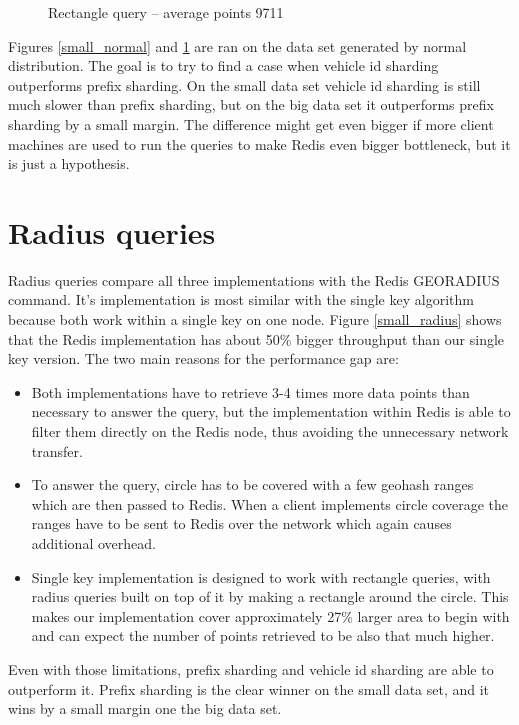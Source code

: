 \documentclass[times, utf8, diplomski]{fer}
\begin{document}
\begin{figure}[h]
\caption{Rectangle query -- average points 9711}
\label{big_normal}
\endminipage\hfill
\end{figure}

Figures \ref{small_normal} and \ref{big_normal} are ran on the data set generated by normal distribution. The goal is to try to find a case when vehicle id sharding outperforms prefix sharding. On the small data set vehicle id sharding is still much slower than prefix sharding, but on the big data set it outperforms prefix sharding by a small margin. The difference might get even bigger if more client machines are used to run the queries to make Redis even bigger bottleneck, but it is just a hypothesis.

\section {Radius queries} \label{radius_results}
Radius queries compare all three implementations with the Redis GEORADIUS command. It's implementation is most similar with the single key algorithm because both work within a single key on one node. Figure \ref{small_radius} shows that the Redis implementation has about 50\% bigger throughput than our single key version. The two main reasons for the performance gap are:
\begin{itemize}
\item Both implementations have to retrieve 3-4 times more data points than necessary to answer the query, but the implementation within Redis is able to filter them directly on the Redis node, thus avoiding the unnecessary network transfer.
\item To answer the query, circle has to be covered with a few geohash ranges which are then passed to Redis. When a client implements circle coverage the ranges have to be sent to Redis over the network which again causes additional overhead.
\item Single key implementation is designed to work with rectangle queries, with radius queries built on top of it by making a rectangle around the circle. This makes our implementation cover approximately 27\% larger area to begin with and can expect the number of points retrieved to be also that much higher.
\end{itemize}
Even with those limitations, prefix sharding and vehicle id sharding are able to outperform it. Prefix sharding is the clear winner on the small data set, and it wins by a small margin one the big data set.
\end{document}
